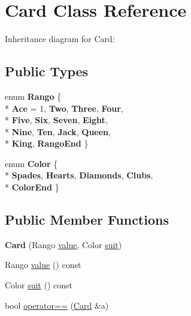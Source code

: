 \hypertarget{class_card}{}\section{Card Class Reference}
\label{class_card}


Inheritance diagram for Card\+:
\subsection*{Public Types}
\begin{DoxyCompactItemize}
\item 
enum {\bfseries Rango} \{ \\*
{\bfseries Ace} = 1, 
{\bfseries Two}, 
{\bfseries Three}, 
{\bfseries Four}, 
\\*
{\bfseries Five}, 
{\bfseries Six}, 
{\bfseries Seven}, 
{\bfseries Eight}, 
\\*
{\bfseries Nine}, 
{\bfseries Ten}, 
{\bfseries Jack}, 
{\bfseries Queen}, 
\\*
{\bfseries King}, 
{\bfseries Rango\+End}
 \}\hypertarget{class_card_a5319d6bf725d009d5010c21a0550d72b}{}\label{class_card_a5319d6bf725d009d5010c21a0550d72b}

\item 
enum {\bfseries Color} \{ \\*
{\bfseries Spades}, 
{\bfseries Hearts}, 
{\bfseries Diamonds}, 
{\bfseries Clubs}, 
\\*
{\bfseries Color\+End}
 \}\hypertarget{class_card_ad5805e73a4727fb7d3c76f3085b05fbe}{}\label{class_card_ad5805e73a4727fb7d3c76f3085b05fbe}

\end{DoxyCompactItemize}
\subsection*{Public Member Functions}
\begin{DoxyCompactItemize}
\item 
{\bfseries Card} (Rango \hyperlink{class_card_a5503f267af005285cdfeaa5633cd41bf}{value}, Color \hyperlink{class_card_ae2a16729f2c4b12afeea5e0524c4a540}{suit})\hypertarget{class_card_aa4882f55331d4cdc9dd88f3d29687575}{}\label{class_card_aa4882f55331d4cdc9dd88f3d29687575}

\item 
Rango \hyperlink{class_card_a5503f267af005285cdfeaa5633cd41bf}{value} () const 
\item 
Color \hyperlink{class_card_ae2a16729f2c4b12afeea5e0524c4a540}{suit} () const 
\item 
bool \hyperlink{class_card_af54ed83aa53a465a952001710a79d6d1}{operator==} (\hyperlink{class_card}{Card} \&a)
\end{DoxyCompactItemize}
